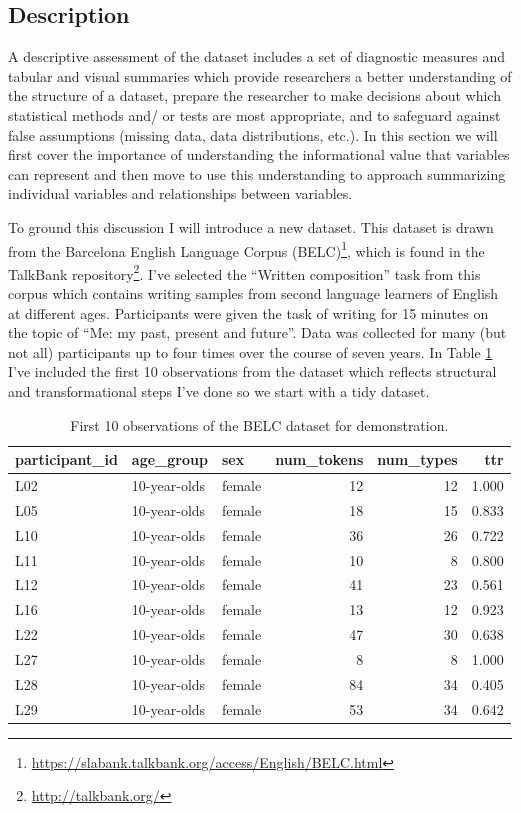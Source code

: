 \documentclass[
]{article}
\DeclareRobustCommand{\href}[2]{#2\footnote{\url{#1}}}
\begin{document}
\hypertarget{description}{%
\subsection{Description}\label{description}}

A descriptive assessment of the dataset includes a set of diagnostic measures and tabular and visual summaries which provide researchers a better understanding of the structure of a dataset, prepare the researcher to make decisions about which statistical methods and/ or tests are most appropriate, and to safeguard against false assumptions (missing data, data distributions, etc.). In this section we will first cover the importance of understanding the informational value that variables can represent and then move to use this understanding to approach summarizing individual variables and relationships between variables.

To ground this discussion I will introduce a new dataset. This dataset is drawn from the \href{https://slabank.talkbank.org/access/English/BELC.html}{Barcelona English Language Corpus (BELC)}, which is found in the \href{http://talkbank.org/}{TalkBank repository}. I've selected the ``Written composition'' task from this corpus which contains writing samples from second language learners of English at different ages. Participants were given the task of writing for 15 minutes on the topic of ``Me: my past, present and future''. Data was collected for many (but not all) participants up to four times over the course of seven years. In Table \ref{tab:belc-overview} I've included the first 10 observations from the dataset which reflects structural and transformational steps I've done so we start with a tidy dataset.

\begin{table}

\caption{\label{tab:belc-overview}First 10 observations of the BELC dataset for demonstration.}
\centering
\begin{tabular}[t]{lllrrr}
\toprule
participant\_id & age\_group & sex & num\_tokens & num\_types & ttr\\
\midrule
L02 & 10-year-olds & female & 12 & 12 & 1.000\\
L05 & 10-year-olds & female & 18 & 15 & 0.833\\
L10 & 10-year-olds & female & 36 & 26 & 0.722\\
L11 & 10-year-olds & female & 10 & 8 & 0.800\\
L12 & 10-year-olds & female & 41 & 23 & 0.561\\
\addlinespace
L16 & 10-year-olds & female & 13 & 12 & 0.923\\
L22 & 10-year-olds & female & 47 & 30 & 0.638\\
L27 & 10-year-olds & female & 8 & 8 & 1.000\\
L28 & 10-year-olds & female & 84 & 34 & 0.405\\
L29 & 10-year-olds & female & 53 & 34 & 0.642\\
\bottomrule
\end{tabular}
\end{table}
\end{document}
